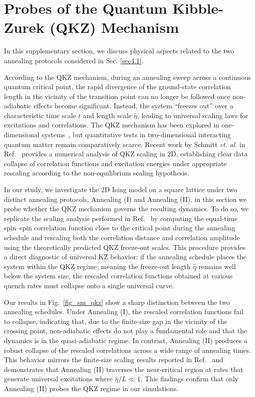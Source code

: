 \documentclass[aps,pra,reprint,amssymb,superscriptaddress]{revtex4-2}
\begin{document}
\appendix

\section{Probes of the Quantum Kibble-Zurek (QKZ) Mechanism}
\label{sec:qkz}

In this supplementary  section, we discuss physical aspects related to the two annealing protocols considered in Sec. \ref{sec4.1}.

According to the QKZ mechanism, during an annealing sweep across a continuous quantum critical point, the rapid divergence of the ground-state correlation length in the vicinity of the transition point can no longer be followed once non-adiabatic effects become significant.
Instead, the system “freezes out” over a characteristic time scale $\hat{t}$ and length scale $\hat{\eta}$, leading to universal scaling laws for excitations and correlations. The QKZ mechanism has been explored in one-dimensional systems~\cite{zhang_observation_2025, keesling_quantum_2019}, but quantitative tests in two-dimensional interacting quantum matter remain comparatively scarce. Recent work by Schmitt \textit{et. al.} in Ref.~\cite{schmitt_quantum_2022} provides a numerical analysis of QKZ scaling in 2D, establishing clear data collapse of correlation functions and excitation energies under appropriate rescaling according to the non-equilibrium scaling hypothesis. 

In our study, we investigate the 2D Ising model on a square lattice under two distinct annealing protocols, Annealing (I) and Annealing (II), in this section we probe whether the QKZ mechanism governs the resulting dynamics. To do so, we replicate the scaling analysis performed in Ref.~\cite{schmitt_quantum_2022} by computing the equal-time spin–spin correlation function close to the critical point during the annealing schedule and rescaling both the correlation distance and correlation amplitude using the theoretically predicted QKZ freeze-out scales. This procedure provides a direct diagnostic of universal KZ behavior: if the annealing schedule places the system within the QKZ regime; meaning the freeze-out length $\hat{\eta}$ remains well below the system size, the rescaled correlation functions obtained at various quench rates must collapse onto a single universal curve.

Our results in Fig.~\ref{fig_sm_qkz} show a sharp distinction between the two annealing schedules. Under Annealing (I), the rescaled correlation functions fail to collapse, indicating that, due to the finite-size gap in the vicinity of the crossing point, non-adiabatic effects do not play a fundamental role and that the dynamics is in the quasi-adiabatic regime. 
In contrast, Annealing (II) produces a robust collapse of the rescaled correlations across a wide range of annealing times. This behavior mirrors the  finite-size scaling results reported in Ref.~\cite{schmitt_quantum_2022} and demonstrates that Annealing (II) traverses the near-critical region at rates that generate universal excitations where $\hat{\eta}/L\ll1$. This findings confirm that only Annealing (II) probes the QKZ regime in our simulations. 
\end{document}
